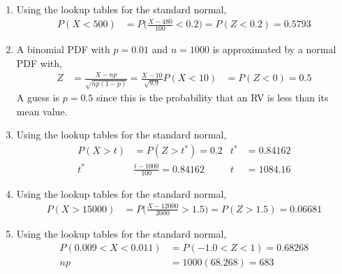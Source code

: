 \begin{enumerate}
    \item Using the lookup tables for the standard normal,
          \begin{align}
              P(X < 500) & = P\Bigg( \frac{X-480}{100} < 0.2 \Bigg) = P(Z < 0.2)
              = 0.5793
          \end{align}

    \item A binomial PDF with $ p = 0.01 $ and $ n = 1000 $ is approximated by a
          normal PDF with,
          \begin{align}
              Z         & = \frac{X - np}{\sqrt{np(1-p)}} = \frac{X - 10}{\sqrt{9.9}}
              P(X < 10) & = P(Z < 0) = 0.5
          \end{align}
          A guess is $ p = 0.5 $ since this is the probability that an RV is less than
          its mean value.

    \item Using the lookup tables for the standard normal,
          \begin{align}
              P(X > t) & = P(Z > t^*) = 0.2             &
              t^*      & = 0.84162                        \\
              t^*      & \frac{t - 1000}{100} = 0.84162 &
              t        & = 1084.16
          \end{align}

    \item Using the lookup tables for the standard normal,
          \begin{align}
              P(X > 15000) & = P\Bigg( \frac{X-12000}{2000} > 1.5 \Bigg) = P(Z > 1.5)
              = 0.06681
          \end{align}

    \item Using the lookup tables for the standard normal,
          \begin{align}
              P(0.009 < X < 0.011) & = P(-1.0 < Z < 1) = 0.68268 \\
              np                   & = 1000(68.268) = 683
          \end{align}


\end{enumerate}
